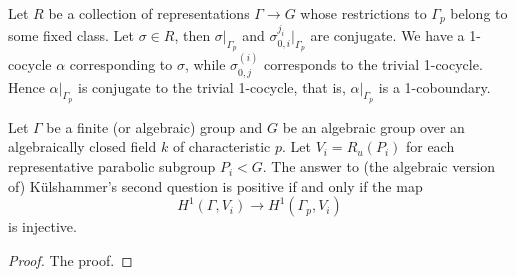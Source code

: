 Let $R$ be a collection of representations $\Gamma \rightarrow G$ whose restrictions to $\Gamma_p$ belong to some fixed class. Let $\sigma\in R$, then $\sigma|_{\Gamma_p}$ and $\sigma^{j_i}_{0,i}|_{\Gamma_p}$ are conjugate. We have a 1-cocycle $\alpha$ corresponding to $\sigma$, while $\sigma_{0,j}^{(i)}$ corresponds to the trivial 1-cocycle. Hence $\alpha|_{\Gamma_p}$ is conjugate to the trivial 1-cocycle, that is, $\alpha|_{\Gamma_p}$ is a 1-coboundary. 

% 
% 
% 
% 



\begin{lemma}\label{kToHOne} Let $\Gamma$ be a finite (or algebraic) group and $G$ be an algebraic group over an algebraically closed field $k$ of characteristic $p$. Let $V_i = R_u(P_i)$ for each representative parabolic subgroup $P_i<G$. The answer to (the algebraic version of) K\"ulshammer's second question is positive if and only if the map
	\begin{displaymath}
		H^1(\Gamma, V_i) \rightarrow H^1(\Gamma_p, V_i)
	\end{displaymath}
	is injective.
\end{lemma}
\begin{proof}
	The proof.
\end{proof}

